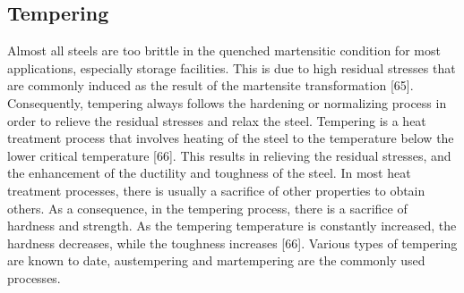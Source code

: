 \documentclass[12pt]{report}
\begin{document}
\subsection{Tempering}  
Almost all steels are too brittle in the quenched martensitic condition for most applications, especially storage facilities. This is due to high residual stresses that are commonly induced as the result of the martensite transformation [65]. Consequently, tempering always follows the hardening or normalizing process in order to relieve the residual stresses and relax the steel. 
Tempering is a heat treatment process that involves heating of the steel to the temperature below the lower critical temperature [66]. This results in relieving the residual stresses, and the enhancement of the ductility and toughness of the steel. In most heat treatment processes, there is usually a sacrifice of other properties to obtain others. As a consequence, in the tempering process, there is a sacrifice of hardness and strength. As the tempering temperature is constantly increased, the hardness decreases, while the toughness increases [66]. Various types of tempering are known to date, austempering and martempering are the commonly used processes.
\end{document}
